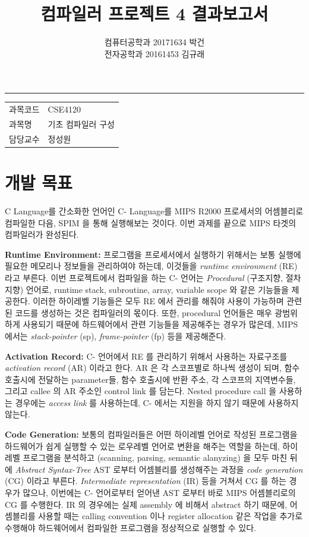 \documentclass[a4paper,12p]{paper}
\date{\vspace{-5ex}}
\title{컴파일러 프로젝트 4 결과보고서}
\author{컴퓨터공학과 20171634 박건\\전자공학과 20161453 김규래}
\begin{document}
 
\maketitle\hrule{}\bigskip

\begin{center}
\begin{tabular}{ l l }
과목코드 & CSE4120 \\
과목명  & 기초 컴파일러 구성 \\
담당교수 & 정성원 \\
\end{tabular}
\end{center}

\section{개발 목표}
C Language를 간소화한 언어인 C- Language를 MIPS R2000 프로세서의 어셈블리로 컴파일한 다음, SPIM 을 통해 실행해보는 것이다. 이번 과제를 끝으로 MIPS 타겟의 컴파일러가 완성된다.

\vspace{0.1in}
\noindent\textbf{Runtime Environment:} 프로그램을 프로세서에서 실행하기 위해서는 보통 실행에 필요한 메모리나 정보들을 관리하여야 하는데, 이것들을 \textit{runtime environment} (RE) 라고 부른다. 이번 프로젝트에서 컴파일을 하는 C- 언어는 \textit{Procedural} (구조지향, 절차지향) 언어로, runtime stack, subroutine, array, variable scope 와 같은 기능들을 제공한다. 이러한 하이레벨 기능들은 모두 RE 에서 관리를 해줘야 사용이 가능하며 관련된 코드를 생성하는 것은 컴파일러의 몫이다. 또한, procedural 언어들은 매우 광범위하게 사용되기 때문에 하드웨어에서 관련 기능들을 제공해주는 경우가 많은데, MIPS 에서는 \textit{stack-pointer} (sp), \textit{frame-pointer} (fp) 등을 제공해준다.

\vspace{0.1in}
\noindent\textbf{Activation Record:} C- 언어에서 RE 를 관리하기 위해서 사용하는 자료구조를 \textit{activation record} (AR) 이라고 한다. AR 은 각 스코프별로 하나씩 생성이 되며, 함수호출시에 전달하는 parameter들, 함수 호출시에 반환 주소, 각 스코프의 지역변수들, 그리고 callee 의 AR 주소인 control link 를 담는다. Nested procedure call 을 사용하는 경우에는 \textit{access link} 를 사용하는데, C- 에서는 지원을 하지 않기 때문에 사용하지 않는다.

\vspace{0.1in}
\noindent\textbf{Code Generation:} 보통의 컴파일러들은 어떤 하이레벨 언어로 작성된 프로그램을 하드웨어가 쉽게 실행할 수 있는 로우레벨 언어로 변환을 해주는 역할을 하는데, 하이레벨 프로그램을 분석하고 (scanning, parsing, semantic alanyzing) 을 모두 마친 뒤에 \textit{Abstract Syntax-Tree} AST 로부터 어셈블리를 생성해주는 과정을 \textit{code generation} (CG) 이라고 부른다. \textit{Intermediate representation} (IR) 등을 거쳐서 CG 를 하는 경우가 많으나, 이번에는 C- 언어로부터 얻어낸 AST 로부터 바로 MIPS 어셈블리로의 CG 를 수행한다. IR 의 경우에는 실제 assembly 에 비해서 abstract 하기 때문에, 어셈블리를 사용할 때는 calling convention 이나 register allocation 같은 작업을 추가로 수행해야 하드웨어에서 컴파일한 프로그램을 정상적으로 실행할 수 있다.
\end{document}
